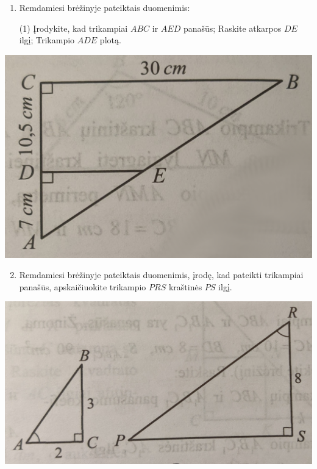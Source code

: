 \documentclass[a4paper]{article}
\begin{document}
\begin{minipage}{0.5\textwidth}
      \begin{enumerate}
            \setcounter{enumi}{0} %
            \item Remdamiesi brėžinyje pateiktais duomenimis:
                  \begin{tasks}[item-format={\normalfont}, after-item-skip=2mm](1)
                        \task Įrodykite, kad trikampiai $ABC$ ir $AED$ panašūs;
                        \task Raskite atkarpos $DE$ ilgį;
                        \task Trikampio $ADE$ plotą.
                  \end{tasks}
      \end{enumerate}

      \begin{center}
            \includegraphics[scale=0.5]{images/triangle_1.png}
      \end{center}

\end{minipage}
\begin{minipage}{0.5\textwidth}
      \begin{enumerate}
            \setcounter{enumi}{1} %
            \item Remdamiesi brėžinyje pateiktais duomenimis, įrodę, kad pateikti trikampiai
                  panašūs, apskaičiuokite trikampio $PRS$ kraštinės $PS$ ilgį.
      \end{enumerate}
      \begin{center}
            \includegraphics[scale=0.5]{images/triangle_2.png}
      \end{center}
\end{minipage}
\end{document}
